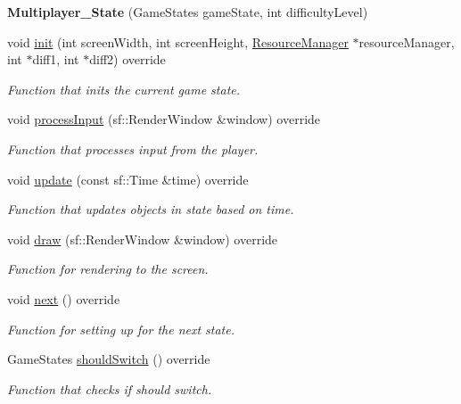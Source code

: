 \begin{DoxyCompactItemize}
\item 
{\bfseries Multiplayer\+\_\+\+State} (Game\+States game\+State, int difficulty\+Level)\hypertarget{classMultiplayer__State_a59593ec2676c91fe3200e98e4b5f6e83}{}\label{classMultiplayer__State_a59593ec2676c91fe3200e98e4b5f6e83}

\item 
void \hyperlink{classMultiplayer__State_a17a0471f40aa58b6a280f848f5cdf011}{init} (int screen\+Width, int screen\+Height, \hyperlink{classResourceManager}{Resource\+Manager} $\ast$resource\+Manager, int $\ast$diff1, int $\ast$diff2) override
\begin{DoxyCompactList}\small\item\em Function that inits the current game state. \end{DoxyCompactList}\item 
void \hyperlink{classMultiplayer__State_a3b37f5f4a0f93df74a26bb963f66f656}{process\+Input} (sf\+::\+Render\+Window \&window) override
\begin{DoxyCompactList}\small\item\em Function that processes input from the player. \end{DoxyCompactList}\item 
void \hyperlink{classMultiplayer__State_ad0c3372f28d6e7d277f1de6ed23a7647}{update} (const sf\+::\+Time \&time) override
\begin{DoxyCompactList}\small\item\em Function that updates objects in state based on time. \end{DoxyCompactList}\item 
void \hyperlink{classMultiplayer__State_a7103a5b0cf5730f1b1d002693d7c14f6}{draw} (sf\+::\+Render\+Window \&window) override
\begin{DoxyCompactList}\small\item\em Function for rendering to the screen. \end{DoxyCompactList}\item 
void \hyperlink{classMultiplayer__State_ad0721f7d762eff048b125078344e0ec7}{next} () override\hypertarget{classMultiplayer__State_ad0721f7d762eff048b125078344e0ec7}{}\label{classMultiplayer__State_ad0721f7d762eff048b125078344e0ec7}

\begin{DoxyCompactList}\small\item\em Function for setting up for the next state. \end{DoxyCompactList}\item 
Game\+States \hyperlink{classMultiplayer__State_a5dc3a250487c9c009c64b60f1be2b635}{should\+Switch} () override
\begin{DoxyCompactList}\small\item\em Function that checks if should switch. \end{DoxyCompactList}\end{DoxyCompactItemize}
